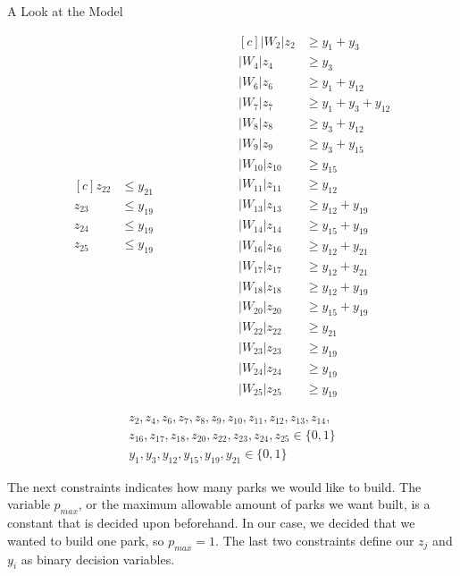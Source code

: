 \documentclass[12pt]{pom_thesis}
\begin{document}
\begin{chapter}{A Look at the Model}
\begin{figure}
\begin{equation*}
\begin{aligned}[c]
	z_{22} &\leq y_{21} \\
	z_{23} &\leq y_{19} \\
	z_{24} &\leq y_{19} \\
	z_{25} &\leq y_{19} 
	\end{aligned}
	\qquad \qquad \qquad
	\begin{aligned}[c]
	|W_2|z_2 &\geq y_1 + y_3 \\
	|W_4|z_4 &\geq y_3 \\
	|W_6|z_6 &\geq y_1 + y_{12} \\
	|W_7|z_7 &\geq y_1 + y_3 + y_{12} \\
	|W_8|z_8 &\geq y_3 + y_{12} \\
	|W_9|z_9 &\geq y_3 + y_{15} \\
	|W_{10}|z_{10}&\geq y_{15} \\
	|W_{11}|z_{11}&\geq y_{12} \\
	|W_{13}|z_{13}&\geq y_{12} + y_{19} \\
	|W_{14}|z_{14}&\geq y_{15} + y_{19} \\
	|W_{16}|z_{16}&\geq y_{12} + y_{21} \\
	|W_{17}|z_{17}&\geq y_{12} + y_{21} \\
	|W_{18}|z_{18}&\geq y_{12} + y_{19} \\
	|W_{20}|z_{20}&\geq y_{15} + y_{19} \\
	|W_{22}|z_{22}&\geq y_{21} \\
	|W_{23}|z_{23}&\geq y_{19} \\
	|W_{24}|z_{24}&\geq y_{19} \\
	|W_{25}|z_{25}&\geq y_{19}
	\end{aligned}
	\end{equation*}
	\begin{center}
	\begin{align*}
	z_2, z_4, z_6, z_7, z_8, z_9, z_{10}, z_{11}, z_{12}, z_{13}, z_{14}, \\
	z_{16}, z_{17}, z_{18}, z_{20}, z_{22}, z_{23}, z_{24}, z_{25} \in \{0,1\} \\
	y_1,y_3,y_{12},y_{15},y_{19},y_{21} \in \{0,1\}
	\end{align*}
	\end{center}
	\end{figure}
	  The next constraints indicates how many parks we would like to build. The variable $p_{max}$, or the maximum allowable amount of parks we want built, is a constant that is decided upon beforehand. In our case, we decided that we wanted to build one park, so $p_{max} = 1$. The last two constraints define our $z_j$ and $y_i$ as binary decision variables.


\end{chapter}
\end{document}

